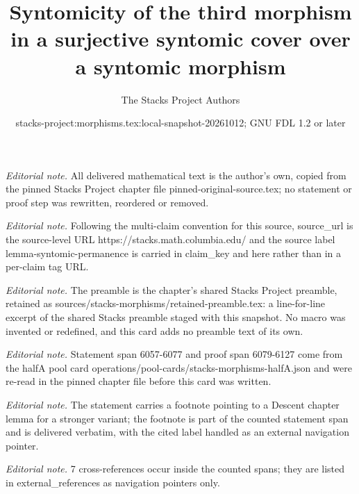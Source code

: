 \documentclass[10pt,a4paper]{amsart}
\title{Syntomicity of the third morphism in a surjective syntomic cover over a syntomic morphism}
\author{The Stacks Project Authors}
\date{stacks-project:morphisms.tex:local-snapshot-20261012; GNU FDL 1.2 or later}
\theoremstyle{plain}
\theoremstyle{definition}
\theoremstyle{remark}
\numberwithin{equation}{subsection}
\begin{document}
\maketitle
\noindent\textit{Editorial note.} All delivered mathematical text is the author's own, copied from the pinned Stacks Project chapter file pinned-original-source.tex; no statement or proof step was rewritten, reordered or removed.\par\medskip
\noindent\textit{Editorial note.} Following the multi-claim convention for this source, source\_url is the source-level URL https://stacks.math.columbia.edu/ and the source label lemma-syntomic-permanence is carried in claim\_key and here rather than in a per-claim tag URL.\par\medskip
\noindent\textit{Editorial note.} The preamble is the chapter's shared Stacks Project preamble, retained as sources/stacks-morphisms/retained-preamble.tex: a line-for-line excerpt of the shared Stacks preamble staged with this snapshot. No macro was invented or redefined, and this card adds no preamble text of its own.\par\medskip
\noindent\textit{Editorial note.} Statement span 6057-6077 and proof span 6079-6127 come from the halfA pool card operations/pool-cards/stacks-morphisms-halfA.json and were re-read in the pinned chapter file before this card was written.\par\medskip
\noindent\textit{Editorial note.} The statement carries a footnote pointing to a Descent chapter lemma for a stronger variant; the footnote is part of the counted statement span and is delivered verbatim, with the cited label handled as an external navigation pointer.\par\medskip
\noindent\textit{Editorial note.} 7 cross-references occur inside the counted spans; they are listed in external\_references as navigation pointers only.\par\medskip
\end{document}
